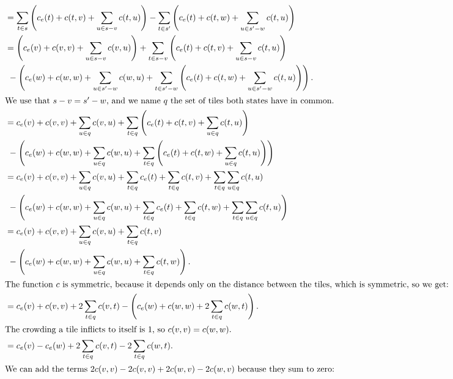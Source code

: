 \begin{align*}
     & = \sum_{t \in s} \left(c_e(t) + c(t,v) + \sum_{u \in s - v} c(t,u)\right) - \sum_{t \in s'} \left(c_e(t) + c(t,w) + \sum_{u \in s' - w} c(t,u) \right) \\
     & = \left(c_e(v) + c(v,v) + \sum_{u \in s - v} c(v,u)\right) + \sum_{t \in s - v} \left(c_e(t) + c(t,v) + \sum_{u \in s - v} c(t,u)\right)               \\
     & \ - \left(c_e(w) + c(w,w) + \sum_{u \in s' - w} c(w,u) + \sum_{t \in s' - w} \left(c_e(t) + c(t,w) + \sum_{u \in s' - w} c(t,u) \right) \right).       \\
    \intertext{We use that $s - v = s' - w$, and we name $q$ the set of tiles both states have in common.}
     & = c_e(v) + c(v,v) + \sum_{u \in q} c(v,u) + \sum_{t \in q} \left(c_e(t) + c(t,v) + \sum_{u \in q} c(t,u)\right)                                        \\
     & \ - \left(c_e(w) + c(w,w) + \sum_{u \in q} c(w,u) + \sum_{t \in q} \left(c_e(t) + c(t,w) + \sum_{u \in q} c(t,u) \right)\right)                        \\
     & = c_e(v) + c(v,v) + \sum_{u \in q} c(v,u) + \sum_{t \in q} c_e(t) + \sum_{t \in q} c(t,v) + \sum_{t \in q} \sum_{u \in q} c(t,u)                       \\
     & \ - \left(c_e(w) + c(w,w) + \sum_{u \in q} c(w,u) + \sum_{t \in q} c_e(t) + \sum_{t \in q} c(t,w) + \sum_{t \in q} \sum_{u \in q} c(t,u)\right)        \\
     & = c_e(v) + c(v,v) + \sum_{u \in q} c(v,u) +  \sum_{t \in q} c(t,v)                                                                                     \\
     & \ - \left(c_e(w) + c(w,w) + \sum_{u \in q} c(w,u) + \sum_{t \in q} c(t,w) \right).                                                                     \\
    \intertext{The function $c$ is symmetric, because it depends only on the distance between the tiles, which is symmetric, so we get:}
     & = c_e(v) + c(v,v) + 2 \sum_{t \in q} c(v,t) - \left(c_e(w) + c(w,w) + 2 \sum_{t \in q} c(w,t) \right).                                                 \\
    \intertext{The crowding a tile inflicts to itself is 1, so $c(v,v) = c(w,w)$.}
     & = c_e(v) - c_e(w)  + 2 \sum_{t \in q} c(v,t) - 2 \sum_{t \in q} c(w,t) .                                                                               \\
    \intertext{We can add the terms $2c(v,v) - 2c(v,v) + 2c(w,v) - 2c(w,v)$ because they sum to zero:}

\end{align*}
